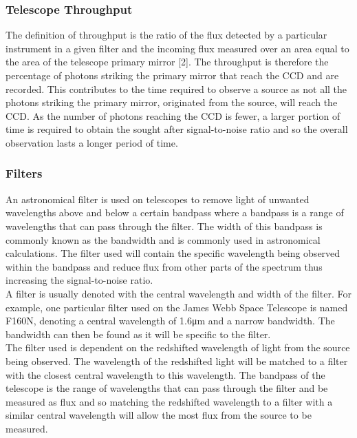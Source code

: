 \documentclass[pdf,color]{UoBnote}
\begin{document}
\subsubsection{Telescope Throughput}
The definition of throughput is the ratio of the flux detected by a particular instrument in a given filter and the incoming flux measured over an area equal to the area of the telescope primary mirror [2]. The throughput is therefore the percentage of photons striking the primary mirror that reach the CCD and are recorded. This contributes to the time required to observe a source as not all the photons striking the primary mirror, originated from the source, will reach the CCD. As the number of photons reaching the CCD is fewer, a larger portion of time is required to obtain the sought after signal-to-noise ratio and so the overall observation lasts a longer period of time.

\subsubsection{Filters}
An astronomical filter is used on telescopes to remove light of unwanted wavelengths above and below a certain bandpass where a bandpass is a range of wavelengths that can pass through the filter. The width of this bandpass is commonly known as the bandwidth and is commonly used in astronomical calculations. The filter used will contain the specific wavelength being observed within the bandpass and reduce flux from other parts of the spectrum thus increasing the signal-to-noise ratio.\\
\newline
A filter is usually denoted with the central wavelength and width of the filter. For example, one particular filter used on the James Webb Space Telescope is named F160N, denoting a central wavelength of 1.6μm and a narrow bandwidth. The bandwidth can then be found as it will be specific to the filter. \\
\newline
The filter used is dependent on the redshifted wavelength of light from the source being observed. The wavelength of the redshifted light will be matched to a filter with the closest central wavelength to this wavelength. The bandpass of the telescope is the range of wavelengths that can pass through the filter and be measured as flux and so matching the redshifted wavelength to a filter with a similar central wavelength will allow the most flux from the source to be measured.
\end{document}
